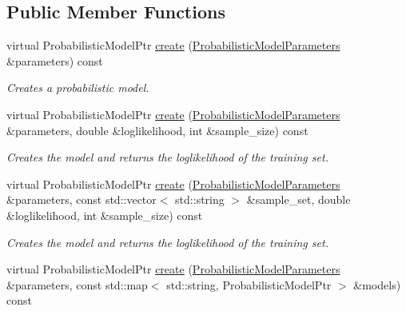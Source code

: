 \subsection*{Public Member Functions}
\begin{DoxyCompactItemize}
\item 
virtual Probabilistic\+Model\+Ptr \hyperlink{classtops_1_1ProbabilisticModelCreator_afed6c8ffa45fff446bdaa8b533da8f7c}{create} (\hyperlink{classtops_1_1ProbabilisticModelParameters}{Probabilistic\+Model\+Parameters} \&parameters) const
\begin{DoxyCompactList}\small\item\em Creates a probabilistic model. \end{DoxyCompactList}\item 
\mbox{\label{classtops_1_1ProbabilisticModelCreator_a955a04df47682338236ec54f4c06a1a0}} 
virtual Probabilistic\+Model\+Ptr \hyperlink{classtops_1_1ProbabilisticModelCreator_a955a04df47682338236ec54f4c06a1a0}{create} (\hyperlink{classtops_1_1ProbabilisticModelParameters}{Probabilistic\+Model\+Parameters} \&parameters, double \&loglikelihood, int \&sample\+\_\+size) const
\begin{DoxyCompactList}\small\item\em Creates the model and returns the loglikelihood of the training set. \end{DoxyCompactList}\item 
\mbox{\label{classtops_1_1ProbabilisticModelCreator_a17917058f57a25d8a88886a19f672344}} 
virtual Probabilistic\+Model\+Ptr \hyperlink{classtops_1_1ProbabilisticModelCreator_a17917058f57a25d8a88886a19f672344}{create} (\hyperlink{classtops_1_1ProbabilisticModelParameters}{Probabilistic\+Model\+Parameters} \&parameters, const std\+::vector$<$ std\+::string $>$ \&sample\+\_\+set, double \&loglikelihood, int \&sample\+\_\+size) const
\begin{DoxyCompactList}\small\item\em Creates the model and returns the loglikelihood of the training set. \end{DoxyCompactList}\item 
\mbox{\label{classtops_1_1ProbabilisticModelCreator_a90daa44181259291f76c97c60a179e8e}} 
virtual Probabilistic\+Model\+Ptr \hyperlink{classtops_1_1ProbabilisticModelCreator_a90daa44181259291f76c97c60a179e8e}{create} (\hyperlink{classtops_1_1ProbabilisticModelParameters}{Probabilistic\+Model\+Parameters} \&parameters, const std\+::map$<$ std\+::string, Probabilistic\+Model\+Ptr $>$ \&models) const

\end{DoxyCompactItemize}
